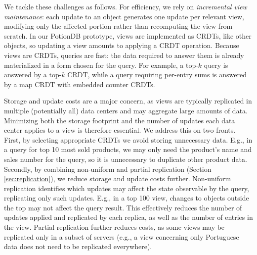 We tackle these challenges as follows.
For efficiency, we rely on \emph{incremental view maintenance}: each update to an object generates one update per relevant view, modifying only the affected portion rather than recomputing the view from scratch.
In our PotionDB prototype, views are implemented as CRDTs, like other objects, so updating a view amounts to applying a CRDT operation.
Because views are CRDTs, queries are fast: the data required to answer them is already materialized in a form chosen for the query.
For example, a top-$k$ query is answered by a top-$k$ CRDT, while a query requiring per-entry sums is answered by a map CRDT with embedded counter CRDTs.

Storage and update costs are a major concern, as views are typically replicated in multiple (potentially all) data centers and may aggregate large amounts of data.
Minimizing both the storage footprint and the number of updates each data center applies to a view is therefore essential.
We address this on two fronts.
First, by selecting appropriate CRDTs we avoid storing unnecessary data.
E.g., in a query for top 10 most sold products, we may only need the product's name and sales number for the query, so it is unnecessary to duplicate other product data.
Secondly, by combining non-uniform and partial replication (Section \ref{sec:replication}), we reduce storage and update costs further.
 Non-uniform replication identifies which updates may affect the state observable by the query, replicating only such updates. %
 E.g., in a top 100 view, changes to objects outside the top may not affect the query result.
 This effectively reduces the number of updates applied and replicated by each replica, as well as the number of entries in the view.
 Partial replication further reduces costs, as some views may be replicated only in a subset of servers (e.g., a view concerning only Portuguese data does not need to be replicated everywhere).
 

